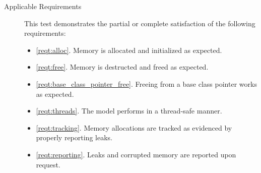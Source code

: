 \begin{description}
\item[Applicable Requirements]
This test demonstrates the partial or complete satisfaction of the 
following requirements:
\begin{itemize}
\item \ref{reqt:alloc}. Memory is allocated and initialized as expected.
\item \ref{reqt:free}. Memory is destructed and freed as expected.
\item \ref{reqt:base_class_pointer_free}. Freeing from a base class pointer
  works as expected.
\item \ref{reqt:threads}. The model performs in a thread-safe manner.
\item \ref{reqt:tracking}. Memory allocations are tracked as evidenced
  by properly reporting leaks.
\item \ref{reqt:reporting}. Leaks and corrupted memory are reported
  upon request.
\end{itemize}

\end{description}
